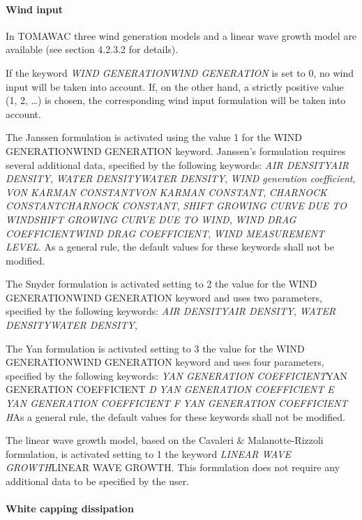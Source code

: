 \paragraph{ Wind input}

 In TOMAWAC three wind generation models and a linear wave growth model are available (see section 4.2.3.2 for details).

 If the keyword \textit{WIND GENERATIONWIND GENERATION} is set to 0, no wind input will be taken into account. If, on the other hand, a strictly positive value (1, 2, \dots ) is chosen, the corresponding wind input formulation will be taken into account.

 The Janssen formulation is activated using the value 1 for the WIND GENERATIONWIND GENERATION keyword. Janssen's formulation requires several additional data, specified by the following keywords:   \textit{AIR DENSITYAIR DENSITY},   \textit{WATER DENSITYWATER DENSITY},   \textit{WIND generation coefficient},   \textit{VON KARMAN CONSTANTVON KARMAN CONSTANT},   \textit{CHARNOCK CONSTANTCHARNOCK CONSTANT},   \textit{SHIFT GROWING CURVE DUE TO WINDSHIFT GROWING CURVE DUE TO WIND,}  \textit{WIND DRAG COEFFICIENTWIND DRAG COEFFICIENT},   \textit{WIND MEASUREMENT LEVEL}.  As a general rule, the default values for these keywords shall not be modified.



 The Snyder formulation is activated setting to 2 the value for the WIND GENERATIONWIND GENERATION keyword and uses two parameters, specified by the following keywords:   \textit{AIR DENSITYAIR DENSITY},   \textit{WATER DENSITYWATER DENSITY},

 The Yan formulation is activated setting to 3 the value for the WIND GENERATIONWIND GENERATION keyword and uses four parameters, specified by the following keywords:   \textit{YAN GENERATION COEFFICIENT}YAN GENERATION COEFFICIENT\textit{ D}  \textit{YAN GENERATION COEFFICIENT E} \textit{YAN GENERATION COEFFICIENT F} \textit{YAN GENERATION COEFFICIENT H}As a general rule, the default values for these keywords shall not be modified.



 The linear wave growth model, based on the Cavaleri \& Malanotte-Rizzoli formulation, is activated setting to 1 the keyword \textit{LINEAR WAVE GROWTH}LINEAR WAVE GROWTH. This formulation does not require any additional data to be specified by the user.


\paragraph{ White capping dissipation}

